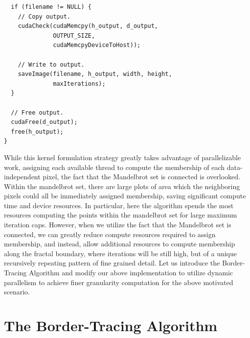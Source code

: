 \documentclass[letterpaper]{article}
\begin{document}
\begin{multicols}{2}
\begin{lstlisting}
  if (filename != NULL) {
    // Copy output.
    cudaCheck(cudaMemcpy(h_output, d_output, 
              OUTPUT_SIZE, 
              cudaMemcpyDeviceToHost));    

    // Write to output.
    saveImage(filename, h_output, width, height, 
              maxIterations);
  }   

  // Free output.
  cudaFree(d_output);
  free(h_output);
}
\end{lstlisting}

While this kernel formulation strategy greatly takes advantage of parallelizable
  work, assigning each available thread to compute the membership of each
  data-independent pixel, the fact that the Mandelbrot set is connected is
  overlooked. Within the mandelbrot set, there are large plots of area which the
  neighboring pixels could all be immediately assigned membership, saving
  significant compute time and device resources. In particular, here the
  algorithm spends the most resources computing the points within the mandelbrot
  set for large maximum iteration caps. 
However, when we utilize the fact that the Mandelbrot set is connected, we can 
  greatly reduce compute resources required to assign membership, and instead, 
  allow additional resources to compute membership along the fractal boundary, 
  where iterations will be still high, but of a unique recursively repeating 
  pattern of fine grained detail.
Let us introduce the Border-Tracing Algorithm and modify our above
  implementation to utilize dynamic parallelism to achieve finer granularity
  computation for the above motivated scenario.

  \section{The Border-Tracing Algorithm}


\end{multicols}
\end{document}
